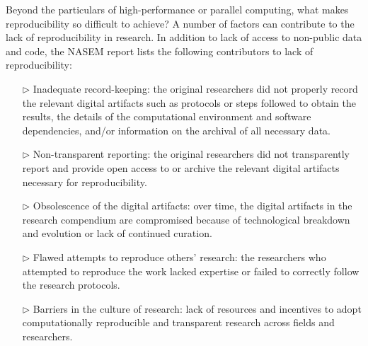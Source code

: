 Beyond the particulars of high-performance or parallel computing, what makes reproducibility so difficult to achieve? 
A number of factors can contribute to the lack of reproducibility in research. 
In addition to lack of access to non-public data and code, the NASEM report lists the following contributors to lack of reproducibility:

\begin{enumerate}

\item[$\triangleright$] Inadequate record-keeping: the original researchers did not properly record the relevant digital artifacts such as protocols or steps followed to obtain the results, the details of the computational environment and software dependencies, and/or information on the archival of all necessary data.
\item[$\triangleright$]  Non-transparent reporting: the original researchers did not transparently report and provide open access to or archive the relevant digital artifacts necessary for reproducibility.
\item[$\triangleright$]  Obsolescence of the digital artifacts: over time, the digital artifacts in the research compendium are compromised because of technological breakdown and evolution or lack of continued curation.
\item[$\triangleright$]  Flawed attempts to reproduce others' research: the researchers who attempted to reproduce the work lacked expertise or failed to correctly follow the research protocols.
\item[$\triangleright$]  Barriers in the culture of research: lack of resources and incentives to adopt computationally reproducible and transparent research across fields and researchers.

\end{enumerate}

